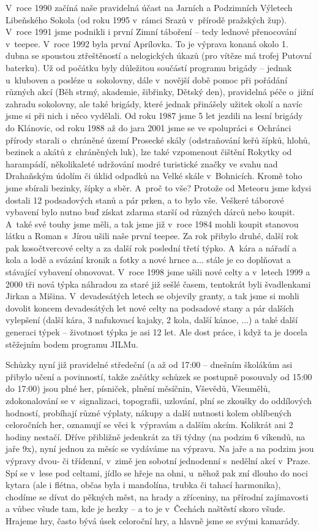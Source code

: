 \documentclass[a5paper, 12pt, twoside]{article}
\begin{document}
V~roce 1990 začíná naše pravidelná účast na Jarních a Podzimních
Výletech Libeňského Sokola (od roku 1995 v~rámci Srazů v~přírodě
pražských žup). V~roce 1991 jsme podnikli i první Zimní táboření -- tedy
lednové přenocování v~teepee. V~roce 1992 byla první Aprílovka. To je
výprava konaná okolo 1. dubna se spoustou ztřeštěností a nelogických
úkazů (pro vítěze má trofej Putovní baterku). Už od počátku byly
důležitou součástí programu brigády -- jednak u~kluboven a posléze
u~sokolovny, dále v~novější době pomoc při pořádání různých akcí (Běh
strmý, akademie, šibřinky, Dětský den), pravidelná péče o~jižní zahradu
sokolovny, ale také brigády, které jednak přinášely užitek okolí a navíc
jsme si při nich i něco vydělali. Od roku 1987 jsme 5 let jezdili na
lesní brigády do Klánovic, od roku 1988 až do jara 2001 jsme se ve
spolupráci s~Ochránci přírody starali o~chráněné území Prosecké skály
(odstraňování keřů šípků, hlohů, bezinek a akátů z~chráněných luk), lze
také vzpomenout čištění Rokytky od harampádí, několikaleté udržování
modré turistické značky ve svahu nad Drahaňským údolím či úklid odpadků
na Velké skále v~Bohnicích. Kromě toho jsme sbírali bezinky, šípky a
sběr. A~proč to vše? Protože od Meteoru jsme kdysi dostali 12
podsadových stanů a pár prken, a to bylo vše. Veškeré táborové vybavení
bylo nutno buď získat zdarma starší od různých dárců nebo koupit. A~také
své touhy jsme měli, a tak jsme již v~roce 1984 mohli koupit stanovou
látku a Roman s~Jírou ušili naše první teepee. Za rok přibylo druhé,
další rok pak kosočtvercové celty a za další rok poslední třetí týpko.
A~kára a nářadí a kola a lodě a svázání kronik a fotky a nové hrnce a...
stále je co doplňovat a stávající vybavení obnovovat. V~roce 1998 jsme
ušili nové celty a v~letech 1999 a 2000 tři nová týpka náhradou za staré
již sešlé časem, tentokrát byli švadlenkami Jirkan a Mišina.
V~devadesátých letech se objevily granty, a tak jsme si mohli dovolit
koncem devadesátých let nové celty na podsadové stany a pár dalších
vylepšení (další kára, 3 nafukovací kajaky, 2 kola, další kánoe, ...) a
také další generaci týpek -- životnost týpka je asi 12 let. Ale dost
práce, i když ta je docela stěžejním bodem programu JILMu.

Schůzky nyní již pravidelné středeční (a až od 17:00 -- dnešním školákům
asi přibylo učení a povinností, takže začátky schůzek se postupně
posouvaly od 15:00 do 17:00) jsou plné her, písniček, plnění měsíčnin,
Vševědů, Všeumělů, zdokonalování se v~signalizaci, topografii, uzlování,
plní se zkoušky do oddílových hodností, probíhají různé výplaty, nákupy
a další nutnosti kolem oblíbených celoročních her, oznamují se věci
k~výpravám a dalším akcím. Kolikrát ani 2 hodiny nestačí. Dříve přibližně
jedenkrát za tři týdny (na podzim 6 víkendů, na jaře 9x), nyní jednou za
měsíc se vydáváme na výpravu. Na jaře a na podzim jsou výpravy dvou- či
třídenní, v~zimě jen sobotní jednodenní s~nedělní akcí v~Praze. Spí se
v~lese pod celtami, jídlo se hřeje na ohni, u~něhož pak zní dlouho do noci
kytara (ale i flétna, občas byla i mandolína, trubka či tahací
harmonika), chodíme se dívat do pěkných měst, na hrady a zříceniny, na
přírodní zajímavosti a vůbec všude tam, kde je hezky -- a to je
v~Čechách naštěstí skoro všude. Hrajeme hry, často bývá úsek celoroční
hry, a hlavně jsme se svými kamarády.
\end{document}
